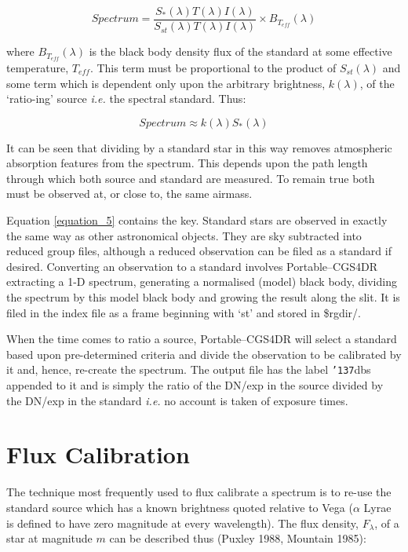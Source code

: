 \documentclass[a4paper]{book}
\renewcommand{\_}{{\tt\char'137}}
\begin{document}
\begin{equation}
  Spectrum = \frac{S_{*}(\lambda) T(\lambda) I(\lambda)}{S_{st}(\lambda) T(\lambda) I(\lambda)} \times B_{T_{eff}}(\lambda)
\label{equation_5}
\end{equation}

where $B_{T_{eff}}(\lambda)$ is the black body density flux of the
standard at some effective temperature, $T_{eff}$. This term must be
proportional to the product of $S_{st}(\lambda)$ and some term which is
dependent only upon the arbitrary brightness, $k(\lambda)$, of the
`ratio-ing' source {\em i.e.} the spectral standard. Thus:

\begin{equation}
  Spectrum \approx k(\lambda) S_{*}(\lambda) \label{equation_6}
\end{equation}

It can be seen that dividing by a standard star in this way removes
atmospheric absorption features from the spectrum. This depends upon the
path length through which both source and standard are measured. To remain
true both must be observed at, or close to, the same airmass.

Equation \ref{equation_5} contains the key. Standard stars are observed in
exactly the same way as other astronomical objects. They are sky
subtracted into reduced group files, although a reduced observation can be
filed as a standard if desired.  Converting an observation to a standard
involves Portable--CGS4DR extracting a 1-D spectrum, generating a
normalised (model) black body, dividing the spectrum by this model black
body and growing the result along the slit. It is filed in the index file
as a frame beginning with `st' and stored in {\sc \$rgdir/}.

When the time comes to ratio a source, Portable--CGS4DR will select a
standard based upon pre-determined criteria and divide the observation to
be calibrated by it and, hence, re-create the spectrum. The output file
has the label \_dbs appended to it and is simply the ratio of the DN/exp
in the source divided by the DN/exp in the standard {\em i.e.} no account
is taken of exposure times.

\section{Flux Calibration}
The technique most frequently used to flux calibrate a spectrum is to
re-use the standard source which has a known brightness quoted relative to
Vega ($\alpha$ Lyrae is defined to have zero magnitude at every
wavelength). The flux density, $F_{\lambda}$, of a star at magnitude $m$
can be described thus (Puxley 1988, Mountain 1985):
\end{document}
